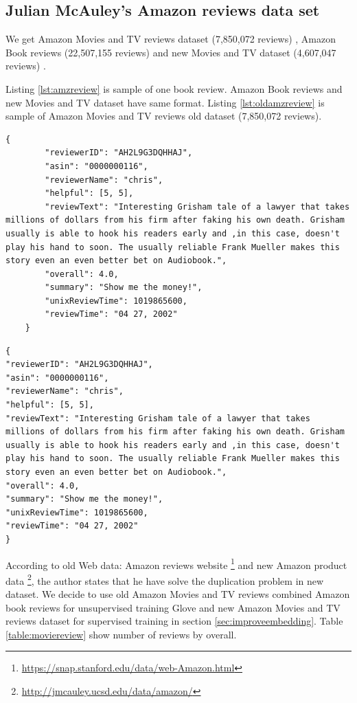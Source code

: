 \subsection{Julian McAuley's Amazon reviews data set}\label{sec:amazon}
We get Amazon Movies and TV reviews dataset (7,850,072 reviews) \cite{mcauley2013hidden}, Amazon Book reviews (22,507,155 reviews) and new Movies and TV dataset (4,607,047 reviews) \cite{he2016ups}. 

Listing \ref{lst:amzreview} is sample of one book review. Amazon Book reviews and new Movies and TV dataset  have same format. Listing \ref{lst:oldamzreview} is sample of Amazon Movies and TV reviews old dataset (7,850,072 reviews). 

\begin{lstlisting}[caption={Amazon reviews sample},label={lst:amzreview}]
	{
		"reviewerID": "AH2L9G3DQHHAJ",
		"asin": "0000000116",
		"reviewerName": "chris",
		"helpful": [5, 5],
		"reviewText": "Interesting Grisham tale of a lawyer that takes millions of dollars from his firm after faking his own death. Grisham usually is able to hook his readers early and ,in this case, doesn't play his hand to soon. The usually reliable Frank Mueller makes this story even an even better bet on Audiobook.",
		"overall": 4.0,
		"summary": "Show me the money!",
		"unixReviewTime": 1019865600,
		"reviewTime": "04 27, 2002"
	}
\end{lstlisting}

\begin{lstlisting}[caption={Old Amazon reviews sample},label={lst:oldamzreview}]
{
"reviewerID": "AH2L9G3DQHHAJ",
"asin": "0000000116",
"reviewerName": "chris",
"helpful": [5, 5],
"reviewText": "Interesting Grisham tale of a lawyer that takes millions of dollars from his firm after faking his own death. Grisham usually is able to hook his readers early and ,in this case, doesn't play his hand to soon. The usually reliable Frank Mueller makes this story even an even better bet on Audiobook.",
"overall": 4.0,
"summary": "Show me the money!",
"unixReviewTime": 1019865600,
"reviewTime": "04 27, 2002"
}
\end{lstlisting}

According to old Web data: Amazon reviews website  \footnote{\url{https://snap.stanford.edu/data/web-Amazon.html}} and new Amazon product data \footnote{\url{http://jmcauley.ucsd.edu/data/amazon/}}, the author states that he have solve the duplication problem in new dataset. We decide to use old Amazon Movies and TV reviews combined Amazon book reviews for unsupervised training Glove and new Amazon Movies and TV reviews dataset for supervised training in section \ref{sec:improveembedding}. Table \ref{table:moviereview} show number of reviews by overall.

